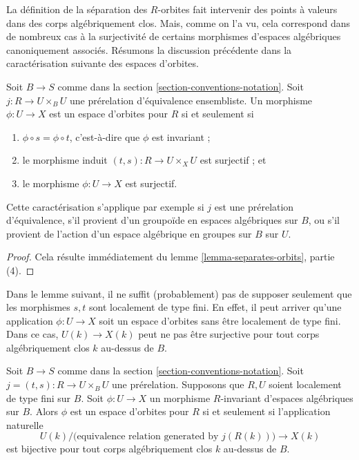 \noindent
La définition de la séparation des $R$-orbites fait intervenir des
points à valeurs dans des corps algébriquement clos. Mais, comme on l'a vu,
cela correspond dans de nombreux cas à la surjectivité de certains
morphismes d'espaces algébriques canoniquement associés.
Résumons la discussion précédente dans la caractérisation suivante
des espaces d'orbites.

\begin{lemma}
\label{lemma-orbit-space}
Soit $B \to S$ comme dans la section \ref{section-conventions-notation}.
Soit $j : R \to U \times_B U$ une prérelation d'équivalence
ensembliste. Un morphisme $\phi : U \to X$ est un espace d'orbites pour $R$ si et seulement si
\begin{enumerate}
\item $\phi \circ s = \phi \circ t$, c'est-à-dire que $\phi$ est invariant ;
\item le morphisme induit $(t, s) : R \to U \times_X U$ est surjectif ; et
\item le morphisme $\phi : U \to X$ est surjectif.
\end{enumerate}
Cette caractérisation s'applique par exemple si $j$ est une prérelation d'équivalence,
s'il provient d'un groupoïde en espaces algébriques sur $B$, ou s'il provient de l'action
d'un espace algébrique en groupes sur $B$ sur $U$.
\end{lemma}

\begin{proof}
Cela résulte immédiatement du lemme \ref{lemma-separates-orbits}, partie (4).
\end{proof}

\noindent
Dans le lemme suivant, il ne suffit (probablement) pas de supposer seulement que
les morphismes $s, t$ sont localement de type fini. En effet,
il peut arriver qu'une application $\phi : U \to X$ soit un espace d'orbites sans être
localement de type fini. Dans ce cas, $U(k) \to X(k)$ peut ne pas
être surjective pour tout corps algébriquement clos $k$ au-dessus de $B$.

\begin{lemma}
\label{lemma-orbit-space-locally-finite-type-over-base}
Soit $B \to S$ comme dans la section \ref{section-conventions-notation}.
Soit $j = (t, s) : R \to U \times_B U$ une prérelation.
Supposons que $R, U$ soient localement de type fini sur $B$.
Soit $\phi : U \to X$ un morphisme $R$-invariant d'espaces algébriques sur $B$.
Alors $\phi$ est un espace d'orbites pour $R$ si et seulement si l'application naturelle
$$
U(k)/\big(\text{equivalence relation generated by }j(R(k))\big)
\longrightarrow
X(k)
$$
est bijective pour tout corps algébriquement clos $k$ au-dessus de $B$.
\end{lemma}

